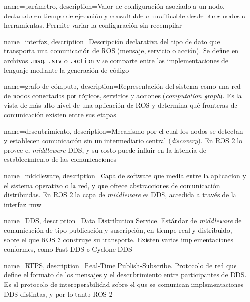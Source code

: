 {
    name={parámetro},
    description={Valor de configuración asociado a un nodo, declarado en
    tiempo de ejecución y consultable o modificable desde otros nodos o
    herramientas. Permite variar la configuración sin recompilar}
}

{
    name={interfaz},
    description={Descripción declarativa del tipo de dato que transporta una
    comunicación de ROS (mensaje, servicio o acción). Se define en archivos
    \texttt{.msg}, \texttt{.srv} o \texttt{.action} y se comparte entre las
    implementaciones de lenguaje mediante la generación de código}
}

{
    name={grafo de cómputo},
    description={Representación del sistema como una red de nodos conectados
    por tópicos, servicios y acciones (\emph{computation graph}). Es la vista
    de más alto nivel de una aplicación de ROS y determina qué fronteras de
    comunicación existen entre sus etapas}
}

{
    name={descubrimiento},
    description={Mecanismo por el cual los nodos se detectan y establecen
    comunicación sin un intermediario central (\emph{discovery}). En ROS 2 lo
    provee el \emph{middleware} DDS, y su costo puede influir en la latencia de
    establecimiento de las comunicaciones}
}


{
    name={middleware},
    description={Capa de software que media entre la aplicación y el sistema
    operativo o la red, y que ofrece abstracciones de comunicación
    distribuidas. En ROS 2 la capa de \emph{middleware} es DDS, accedida a
    través de la interfaz rmw}
}

{
    name={DDS},
    description={Data Distribution Service. Estándar de \emph{middleware} de
    comunicación de tipo publicación y suscripción, en tiempo real y
    distribuido, sobre el que ROS 2 construye su transporte. Existen varias
    implementaciones conformes, como Fast DDS o Cyclone DDS}
}

{
    name={RTPS},
    description={Real-Time Publish-Subscribe. Protocolo de red que define el
    formato de los mensajes y el descubrimiento entre participantes de DDS.
    Es el protocolo de interoperabilidad sobre el que se comunican
    implementaciones DDS distintas, y por lo tanto ROS 2}
}

